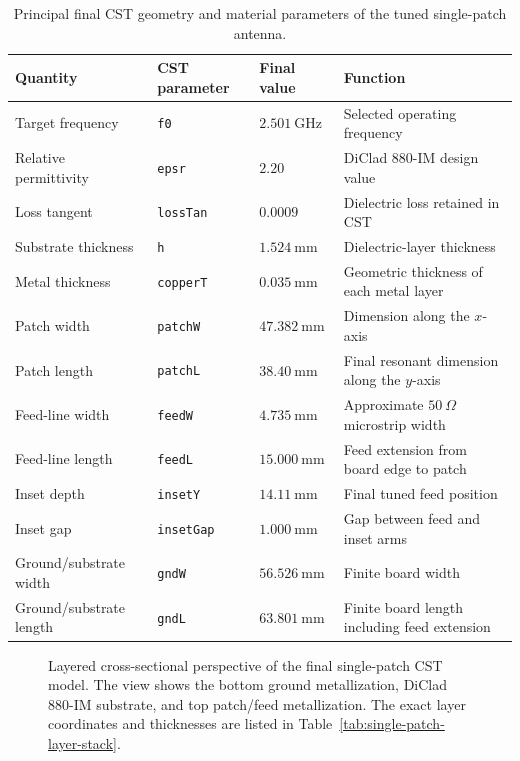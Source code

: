 \begin{table}[H]
\centering
\caption{Principal final CST geometry and material parameters of the tuned single-patch antenna.}
\label{tab:single-patch-final-geometry}
\small
\setlength{\tabcolsep}{5pt}
\renewcommand{\arraystretch}{1.16}
\begin{tabularx}{0.94\textwidth}{@{}
>{\raggedright\arraybackslash}p{}
>{\centering\arraybackslash}p{}
>{\centering\arraybackslash}p{}
>{\raggedright\arraybackslash}X
@{}}
\toprule
\textbf{Quantity} & \textbf{CST parameter} & \textbf{Final value} & \textbf{Function} \\
\midrule
Target frequency & \texttt{f0} & $2.501~\mathrm{GHz}$ & Selected operating frequency \\
Relative permittivity & \texttt{epsr} & $2.20$ & DiClad 880-IM design value \\
Loss tangent & \texttt{lossTan} & $0.0009$ & Dielectric loss retained in CST \\
Substrate thickness & \texttt{h} & $1.524~\mathrm{mm}$ & Dielectric-layer thickness \\
Metal thickness & \texttt{copperT} & $0.035~\mathrm{mm}$ & Geometric thickness of each metal layer \\
Patch width & \texttt{patchW} & $47.382~\mathrm{mm}$ & Dimension along the $x$-axis \\
Patch length & \texttt{patchL} & $38.40~\mathrm{mm}$ & Final resonant dimension along the $y$-axis \\
Feed-line width & \texttt{feedW} & $4.735~\mathrm{mm}$ & Approximate $50~\Omega$ microstrip width \\
Feed-line length & \texttt{feedL} & $15.000~\mathrm{mm}$ & Feed extension from board edge to patch \\
Inset depth & \texttt{insetY} & $14.11~\mathrm{mm}$ & Final tuned feed position \\
Inset gap & \texttt{insetGap} & $1.000~\mathrm{mm}$ & Gap between feed and inset arms \\
Ground/substrate width & \texttt{gndW} & $56.526~\mathrm{mm}$ & Finite board width \\
Ground/substrate length & \texttt{gndL} & $63.801~\mathrm{mm}$ & Finite board length including feed extension \\
\bottomrule
\end{tabularx}
\end{table}

\begin{figure}[H]
    \centering
    \caption[Layered cross-sectional view of the final single-patch model.]{Layered cross-sectional perspective of the final single-patch CST model. The view shows the bottom ground metallization, DiClad 880-IM substrate, and top patch/feed metallization. The exact layer coordinates and thicknesses are listed in Table~\ref{tab:single-patch-layer-stack}.}
    \label{fig:single-patch-cross-section-dimensions}
\end{figure}


